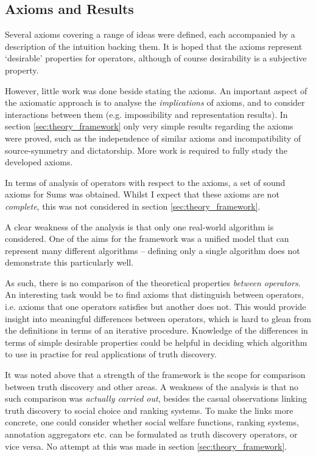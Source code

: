 \documentclass[../../main.tex]{subfiles}
\begin{document}
\subsection*{Axioms and Results}

Several axioms covering a range of ideas were defined, each accompanied by a
description of the intuition backing them. It is hoped that the axioms
represent `desirable' properties for operators, although of course desirability
is a subjective property.

However, little work was done beside stating the axioms. An important aspect
of the axiomatic approach is to analyse the \emph{implications} of axioms, and
to consider interactions between them (e.g. impossibility and representation
results). In section \ref{sec:theory_framework} only very simple results
regarding the axioms were proved, such as the independence of similar axioms
and incompatibility of source-symmetry and dictatorship. More work is required
to fully study the developed axioms.

In terms of analysis of operators with respect to the axioms, a set of sound
axioms for Sums was obtained. Whilst I expect that these axioms are not
\emph{complete}, this was not considered in section \ref{sec:theory_framework}.

A clear weakness of the analysis is that only one real-world algorithm is
considered. One of the aims for the framework was a unified model that can
represent many different algorithms -- defining only a single algorithm does
not demonstrate this particularly well.

As such, there is no comparison of the theoretical properties \emph{between
operators}. An interesting task would be to find axioms that distinguish
between operators, i.e. axioms that one operators satisfies but another does
not. This would provide insight into meaningful differences between operators,
which is hard to glean from the definitions in terms of an iterative procedure.
Knowledge of the differences in terms of simple desirable properties could be
helpful in deciding which algorithm to use in practise for real applications of
truth discovery.

It was noted above that a strength of the framework is the scope for comparison
between truth discovery and other areas. A weakness of the analysis is that no
such comparison was \emph{actually carried out}, besides the casual
observations linking truth discovery to social choice and ranking systems. To
make the links more concrete, one could consider whether social welfare
functions, ranking systems, annotation aggregators etc. can be formulated as
truth discovery operators, or vice versa. No attempt at this was made in
section \ref{sec:theory_framework}.
\end{document}

